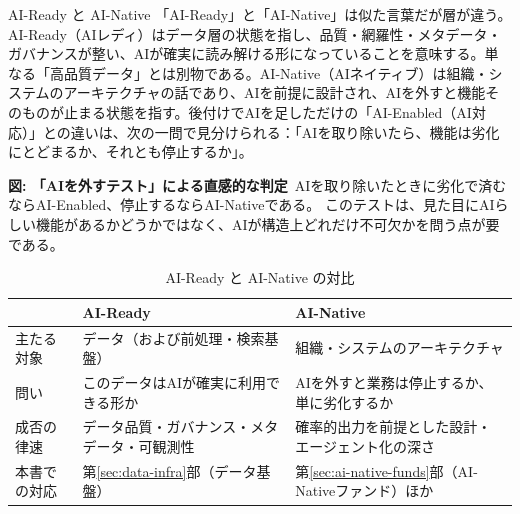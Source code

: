 \begin{concept}{AI-Ready と AI-Native}
「AI-Ready」と「AI-Native」は似た言葉だが層が違う。AI-Ready（AIレディ）はデータ層の状態を指し、品質・網羅性・メタデータ・ガバナンスが整い、AIが確実に読み解ける形になっていることを意味する。単なる「高品質データ」とは別物である。AI-Native（AIネイティブ）は組織・システムのアーキテクチャの話であり、AIを前提に設計され、AIを外すと機能そのものが止まる状態を指す。後付けでAIを足しただけの「AI-Enabled（AI対応）」との違いは、次の一問で見分けられる：「AIを取り除いたら、機能は劣化にとどまるか、それとも停止するか」。
\begin{center}
\end{center}
{\small\color{brandgray}\textbf{図: 「AIを外すテスト」による直感的な判定}\ AIを取り除いたときに劣化で済むならAI-Enabled、停止するならAI-Nativeである。}
このテストは、見た目にAIらしい機能があるかどうかではなく、AIが構造上どれだけ不可欠かを問う点が要である。
\end{concept}

\begin{table}[htbp]
\centering
\small
\caption{AI-Ready と AI-Native の対比}
\label{tab:intro-ready-native}
\begin{tabular}{@{}p{26mm}p{57mm}p{57mm}@{}}
\toprule
 & \textbf{AI-Ready} & \textbf{AI-Native} \\
\midrule
主たる対象 & データ（および前処理・検索基盤） & 組織・システムのアーキテクチャ \\
問い & このデータはAIが確実に利用できる形か & AIを外すと業務は停止するか、単に劣化するか \\
成否の律速 & データ品質・ガバナンス・メタデータ・可観測性 \cite{x01gartner2025aiready} & 確率的出力を前提とした設計・エージェント化の深さ \cite{x01crv2025ainative} \\
本書での対応 & 第\ref{sec:data-infra}部（データ基盤） & 第\ref{sec:ai-native-funds}部（AI-Nativeファンド）ほか \\
\bottomrule
\end{tabular}
\end{table}

